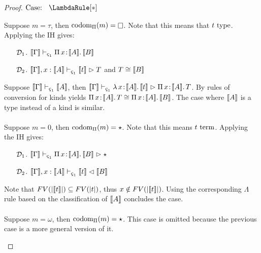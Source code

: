 \begin{proof}
    $\text{Case: }\begin{array}{c} \LambdaRule[*] \end{array}$
    \begin{proofcase}
        Suppose $m = \tau$, then $\pcodom(m) = \kind$.
        Note that this means that $t~\textnormal{type}$.
        Applying the IH gives:
        \begin{enumerate}
            \item[$\mathcal{D}_{1}$.] $\sema{\Gamma} \vdash_{\oldced} \abs{\Pi}{x}{\sema{A}}{\sema{B}}$
            \item[$\mathcal{D}_{2}$.] $\sema{\Gamma}, x : \sema{A} \vdash_{\oldced} \sema{t} \infr T$ and $T \cong \llbracket B \rrbracket$
        \end{enumerate}
        Suppose $\sema{\Gamma} \vdash_{\oldced} \sema{A}$, then $\sema{\Gamma} \vdash_{\oldced} \abs{\lambda}{x}{\sema{A}}{\sema{t}} \infr \abs{\Pi}{x}{\sema{A}}{T}$.
        By rules of conversion for kinds yields ${\Pi}\, x\! : \! \llbracket A \rrbracket.\, T \cong {\Pi}\, x\! : \! \llbracket A \rrbracket.\, \llbracket B \rrbracket$.
        The case where $\llbracket A \rrbracket$ is a type instead of a kind is similar.
        \\ \\
        Suppose $m = 0$, then $\textnormal{codom}_\Pi(m) = \star$.
        Note that this means $t~\textnormal{term}$.
        Applying the IH gives:
        \begin{enumerate}
            \item[$\mathcal{D}_{1}$.] $\sema{\Gamma} \vdash_{\oldced} \abs{\Pi}{x}{\sema{A}}{\sema{B}} \infr \star$
            \item[$\mathcal{D}_{2}$.] $\sema{\Gamma}, x : \sema{A} \vdash_{\oldced} \sema{t} \chck \sema{B}$
        \end{enumerate}
        Note that $FV(|\llbracket t \rrbracket|) \subseteq FV(|t|)$, thus $x \notin FV(|\llbracket t \rrbracket|)$.
        Using the corresponding $\Lambda$ rule based on the classification of $\llbracket A \rrbracket$ concludes the case.
        \\ \\
        Suppose $m = \omega$, then $\textnormal{codom}_\Pi(m) = \star$.
        This case is omitted because the previous case is a more general version of it.
    \end{proofcase}


\end{proof}
